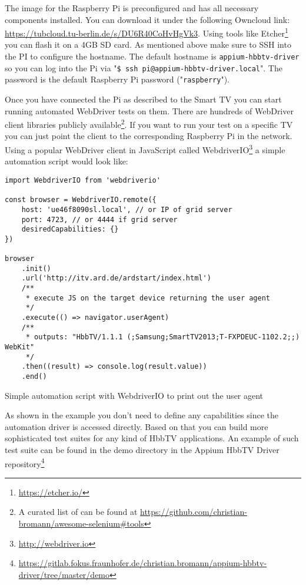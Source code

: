 The image for the Raspberry Pi is preconfigured and has all necessary components installed. You can download it under the following Owncloud link: \url{https://tubcloud.tu-berlin.de/s/DU6R40CoHvHgVk3}. Using tools like Etcher\footnote{\url{https://etcher.io/}} you can flash it on a 4GB SD card. As mentioned above make sure to SSH into the PI to configure the hostname. The default hostname is \texttt{appium-hbbtv-driver} so you can log into the Pi via "\texttt{\$ ssh pi@appium-hbbtv-driver.local}". The password is the default Raspberry Pi password ("\texttt{raspberry}").

Once you have connected the Pi as described to the Smart TV you can start running automated WebDriver tests on them. There are hundreds of WebDriver client libraries publicly available\footnote{A curated list of can be found at \url{https://github.com/christian-bromann/awesome-selenium\#tools}}. If you want to run your test on a specific TV you can just point the client to the corresponding Raspberry Pi in the network. Using a popular WebDriver client in JavaScript called WebdriverIO\footnote{\url{http://webdriver.io}} a simple automation script would look like:

\begin{listing}[H]
\begin{verbatim}
import WebdriverIO from 'webdriverio'

const browser = WebdriverIO.remote({
    host: 'ue46f8090sl.local', // or IP of grid server
    port: 4723, // or 4444 if grid server
    desiredCapabilities: {}
})

browser
    .init()
    .url('http://itv.ard.de/ardstart/index.html')
    /**
     * execute JS on the target device returning the user agent
     */
    .execute(() => navigator.userAgent)
    /**
     * outputs: "HbbTV/1.1.1 (;Samsung;SmartTV2013;T-FXPDEUC-1102.2;;) WebKit"
     */
    .then((result) => console.log(result.value))
    .end()
\end{verbatim}
\caption{Simple automation script with WebdriverIO to print out the user agent}
\label{lst:wdioExample}
\end{listing}

As shown in the example you don't need to define any capabilities since the automation driver is accessed directly. Based on that you can build more sophisticated test suites for any kind of HbbTV applications. An example of such test suite can be found in the demo directory in the Appium HbbTV Driver repository\footnote{\url{https://gitlab.fokus.fraunhofer.de/christian.bromann/appium-hbbtv-driver/tree/master/demo}}

